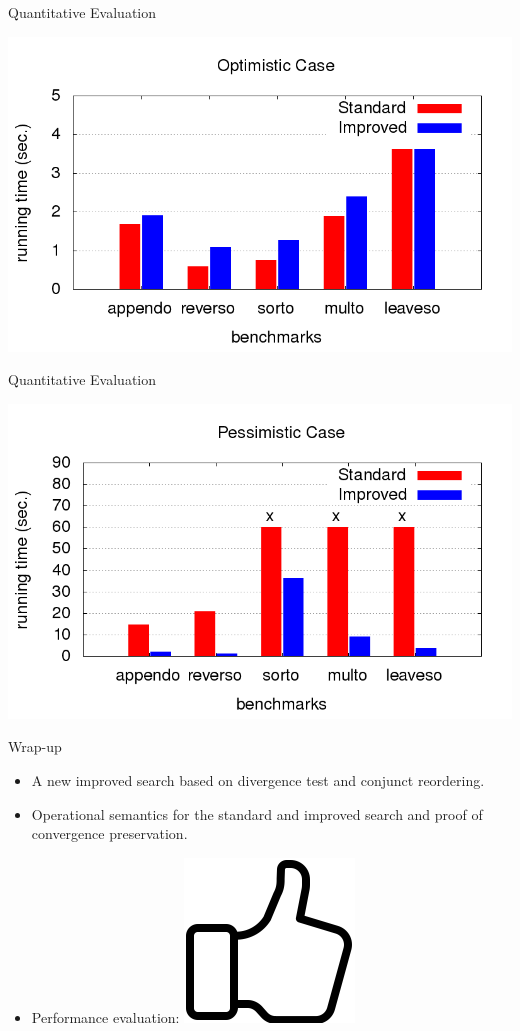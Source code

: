 \documentclass{beamer}
\theoremstyle{definition}
\theoremstyle{plain} %
\begin{document}
\begin{frame}{Quantitative Evaluation}

  \includegraphics[scale=0.5]{optimistic.png}

\end{frame}

\begin{frame}{Quantitative Evaluation}

  \includegraphics[scale=0.5]{pessimistic.png}

\end{frame}


\begin{frame}{Wrap-up}

\begin{itemize}
 \item A new improved search based on divergence test and conjunct reordering.
 \item Operational semantics for the standard and improved search and proof of convergence preservation.
 \item Performance evaluation: \includegraphics[scale=0.09]{thumbs-up.png} 
\end{itemize}

\end{frame}
\end{document}
